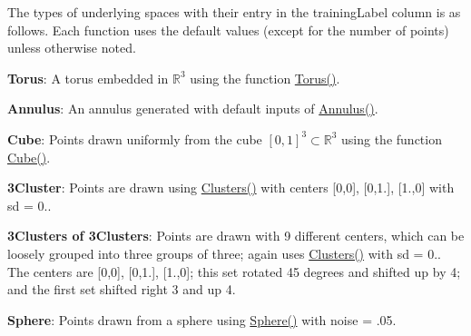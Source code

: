 The types of underlying spaces with their entry in the {\ttfamily training\+Label} column is as follows. Each function uses the default values (except for the number of points) unless otherwise noted.
\begin{DoxyItemize}
\item {\bfseries Torus}\+: A torus embedded in $\mathbb{R}^3$ using the function \hyperlink{namespaceteaspoon_1_1_make_data_1_1_point_cloud_a85b2e43a1f8feda494c13d9c8537c0a2}{Torus()}.
\item {\bfseries Annulus}\+: An annulus generated with default inputs of \hyperlink{namespaceteaspoon_1_1_make_data_1_1_point_cloud_a3720c7f39eecd56c7e4375cc0feef4ed}{Annulus()}.
\item {\bfseries Cube}\+: Points drawn uniformly from the cube $[0,1]^3 \subset \mathbb{R}^3$ using the function \hyperlink{namespaceteaspoon_1_1_make_data_1_1_point_cloud_ad2738d11d9b3018aab5d163587239518}{Cube()}.
\item {\bfseries 3\+Cluster}\+: Points are drawn using \hyperlink{namespaceteaspoon_1_1_make_data_1_1_point_cloud_a130af3abbe5cb02a99c3f64d3f3dd979}{Clusters()} with centers {\ttfamily \mbox{[}0,0\mbox{]}, \mbox{[}0,1.\mbox{]}, \mbox{[}1.,0\mbox{]}} with {\ttfamily sd = 0.}.
\item {\bfseries 3\+Clusters of 3\+Clusters}\+: Points are drawn with 9 different centers, which can be loosely grouped into three groups of three; again uses \hyperlink{namespaceteaspoon_1_1_make_data_1_1_point_cloud_a130af3abbe5cb02a99c3f64d3f3dd979}{Clusters()} with {\ttfamily sd = 0.}. The centers are {\ttfamily \mbox{[}0,0\mbox{]}, \mbox{[}0,1.\mbox{]}, \mbox{[}1.,0\mbox{]}}; this set rotated 45 degrees and shifted up by 4; and the first set shifted right 3 and up 4.
\item {\bfseries Sphere}\+: Points drawn from a sphere using \hyperlink{namespaceteaspoon_1_1_make_data_1_1_point_cloud_af130e51668240f775bca4ff195be2bea}{Sphere()} with {\ttfamily noise = .05}.
\end{DoxyItemize}


